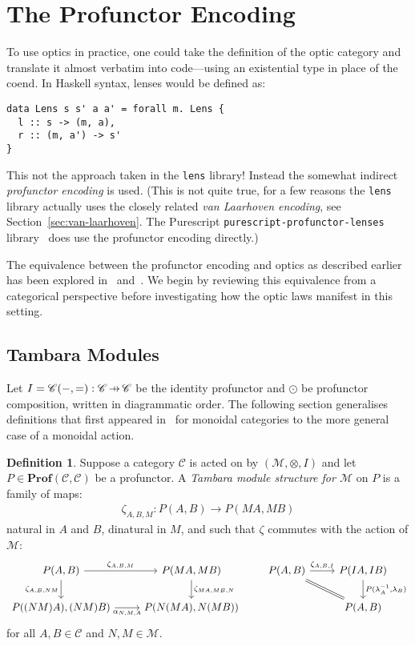 \documentclass[11pt,letterpaper]{article}
\theoremstyle{plain}
\theoremstyle{definition}
\newtheorem{definition}[theorem]{Definition}
\newcommand{\C}{\mathscr{C}}
\newcommand{\M}{\mathscr{M}}
\newcommand{\lenslib}{\texttt{lens}}
\newcommand{\Prof}{\mathbf{Prof}}
\newcommand{\hto}{\ensuremath{\,\mathaccent\shortmid\rightarrow\,}}
\begin{document}
\section{The Profunctor Encoding}\label{sec:profunctor-optics}
To use optics in practice, one could take the definition of the optic category and translate it almost verbatim into code---using an existential type in place of the coend. In Haskell syntax, lenses would be defined as:
\begin{verbatim}
data Lens s s' a a' = forall m. Lens {
  l :: s -> (m, a),
  r :: (m, a') -> s'
}
\end{verbatim}
This not the approach taken in the \lenslib{} library! Instead the somewhat indirect \emph{profunctor encoding} is used. (This is not quite true, for a few reasons the \lenslib{} library actually uses the closely related \emph{van Laarhoven encoding}, see Section~\ref{sec:van-laarhoven}. The Purescript \texttt{purescript-profunctor-lenses} library~\cite{PurescriptLibrary} does use the profunctor encoding directly.)

The equivalence between the profunctor encoding and optics as described earlier has been explored in~\cite{ProfunctorOptics} and~\cite{ProfunctorOpticsPost}. We begin by reviewing this equivalence from a categorical perspective before investigating how the optic laws manifest in this setting.

\subsection{Tambara Modules}
Let $I = \C(-,{=}) : \C \hto \C$ be the identity profunctor and $\odot$ be profunctor composition, written in diagrammatic order. The following section generalises definitions that first appeared in~\cite[Section 3]{Doubles} for monoidal categories to the more general case of a monoidal action.

\begin{definition}
  Suppose a category $\C$ is acted on by $(\M, \otimes, I)$ and let $P \in \Prof(\C, \C)$ be a profunctor. A \emph{Tambara module structure for $\M$} on $P$ is a family of maps:
  \begin{align*}
    \zeta_{A,B,M} : P(A,B) \to P(MA, MB)
  \end{align*}
  natural in $A$ and $B$, dinatural in $M$, and such that $\zeta$ commutes with the action of $\M$:
  \[
    \begin{tikzcd}
      P(A,B) \ar[r, "\zeta_{A,B,M}"] \ar[d, "\zeta_{A, B, NM}" swap] & P(MA, MB) \ar[d, "\zeta_{MA, MB, N}" right] \\
      P((NM)A), (NM)B) \ar[r, "\alpha_{N, M, A}" swap] & P(N(MA), N(MB))
    \end{tikzcd}
    \qquad
    \begin{tikzcd}
      P(A,B) \ar[r, "\zeta_{A,B,I}"] \ar[dr, equal] & P(IA, IB) \ar[d, "{P(\lambda_A^{-1}, \lambda_B)}" right] \\
      & P(A, B)
    \end{tikzcd}
  \]
  for all $A, B \in \C$ and $N, M \in \M$.
\end{definition}
\end{document}
